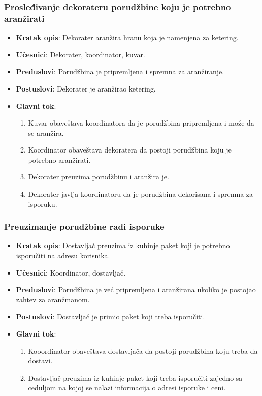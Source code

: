 \subsubsection{Prosleđivanje dekorateru porudžbine koju je potrebno aranžirati}
\begin{itemize}
    \item \textbf{Kratak opis}:
    Dekorater aranžira hranu koja je
    namenjena za ketering.
    \item \textbf{Učesnici}: 
    Dekorater, koordinator, kuvar.
    \item \textbf{Preduslovi}:
    Porudžbina je pripremljena i spremna
    za aranžiranje.
    \item \textbf{Postuslovi}:
    Dekorater je aranžirao ketering.
    \item \textbf{Glavni tok}:
   \begin{enumerate}
        \item Kuvar obaveštava koordinatora da
        je porudžbina pripremljena i može da 
        se aranžira.
        \item Koordinator obaveštava
        dekoratera da postoji porudžbina koju je potrebno aranžirati.
        \item Dekorater preuzima porudžbinu i aranžira je.
        \item Dekorater javlja koordinatoru da 
        je porudžbina dekorisana i spremna za isporuku.
\end{enumerate}
\end{itemize}


\subsubsection{Preuzimanje porudžbine radi isporuke}
\begin{itemize}
    \item \textbf{Kratak opis}:
    Dostavljač preuzima iz kuhinje paket koji je potrebno isporučiti na adresu korisnika.
    \item \textbf{Učesnici}: 
    Koordinator, dostavljač.
    \item \textbf{Preduslovi}:
    Porudžbina je već pripremljena i aranžirana ukoliko je postojao zahtev za aranžmanom.
    \item \textbf{Postuslovi}:
    Dostavljač je primio paket koji treba isporučiti.
    \item \textbf{Glavni tok}:
   \begin{enumerate}
        \item Kooordinator obaveštava
        dostavljača da postoji porudžbina koju 
        treba da dostavi.
        \item Dostavljač preuzima iz kuhinje paket koji treba isporučiti zajedno sa ceduljom na kojoj se nalazi informacija o adresi isporuke i ceni.
\end{enumerate}
\end{itemize}


